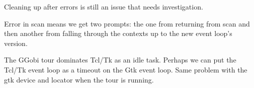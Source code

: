 \documentclass{article}
\begin{document}
\begin{description}
Cleaning up after errors is still an issue that needs
investigation.

\item[] Error in scan means we get two prompts: the one from returning
  from scan and then another from falling through the contexts up to
  the new event loop's version.

\item[] The GGobi tour dominates Tcl/Tk as an idle task. Perhaps we
  can put the Tcl/Tk event loop as a timeout on the Gtk event loop.
  Same problem with the gtk device and locator when the tour is running.

\end{description}
\end{document}
